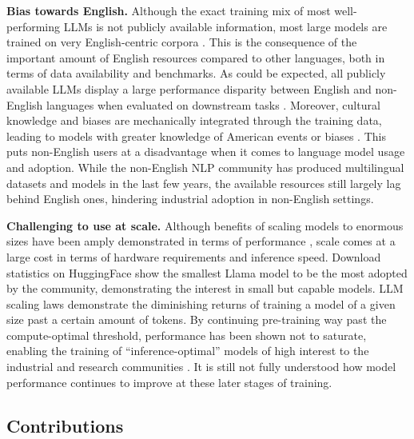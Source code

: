 \textbf{Bias towards English.}
Although the exact training mix of most well-performing LLMs is not publicly available information, most large models are trained on very English-centric corpora \cite{touvron2023llama}.
This is the consequence of the important amount of English resources compared to other languages, both in terms of data availability and benchmarks.
As could be expected, all publicly available LLMs display a large performance disparity between English and non-English languages when evaluated on downstream tasks .
Moreover, cultural knowledge and biases are mechanically integrated through the training data, leading to models with greater knowledge of American events or biases . This puts non-English users at a disadvantage when it comes to language model usage and adoption.
While the non-English NLP community has produced multilingual datasets  and models  in the last few years, the available resources still largely lag behind English ones, hindering industrial adoption in non-English settings.


\textbf{Challenging to use at scale.}
Although benefits of scaling models to enormous sizes have been amply demonstrated in terms of performance , scale comes at a large cost in terms of hardware requirements and inference speed. Download statistics on HuggingFace show the smallest Llama model \cite{touvron2023llama} to be the most adopted by the community, demonstrating the interest in small but capable models. 
LLM scaling laws demonstrate the diminishing returns of training a model of a given size past a certain amount of tokens. By continuing pre-training way past the compute-optimal threshold, performance has been shown not to saturate, enabling the training of ``inference-optimal'' models of high interest to the industrial and research communities . It is still not fully understood how model performance continues to improve at these later stages of training.




\subsection{Contributions}

